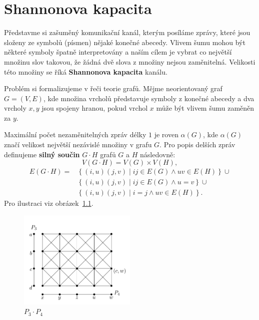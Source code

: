 \chapter{Shannonova kapacita}

Představme si zašuměný komunikační kanál, kterým posíláme zprávy, které jsou složeny ze symbolů (písmen) nějaké konečné abecedy. Vlivem šumu mohou být některé symboly špatně interpretovány a naším cílem je vybrat co největší množinu slov takovou, že žádná dvě slova z množiny nejsou zaměnitelná. Velikosti této množiny se říká \textbf{Shannonova kapacita} kanálu.

Problém si formalizujeme v řeči teorie grafů. Mějme neorientovaný graf $G = (V, E)$, kde množina vrcholů představuje symboly z konečné abecedy a dva vrcholy $x, y$ jsou spojeny hranou, pokud vrchol $x$ může být vlivem šumu zaměněn za $y$.

Maximální počet nezaměnitelných zpráv délky $1$ je roven $\alpha(G)$, kde $\alpha(G)$ značí velikost největší nezávislé množiny v grafu $G$. Pro popis delších zpráv definujeme \textbf{silný součin} $G \cdot H$ grafů $G$ a $H$ následovně:
$$
    V(G \cdot H) = V(G) \times V(H),
$$
\begin{equation*}
    \begin{split}
    E(G \cdot H) = &\left\{ (i,u)(j,v) \mid ij \in E(G) \wedge uv \in E(H) \right\} \cup \\
                   &\left\{ (i,u)(j,v) \mid ij \in E(G) \wedge u = v \right\} \cup \\
                   &\left\{ (i,u)(j,v) \mid i = j \wedge uv \in E(H) \right\}.
    \end{split}
\end{equation*}
Pro ilustraci viz obrázek~\ref{fig:strong_product_P3_P4}.

\begin{figure}[h!]
    \centering
    \includegraphics[width=0.5\textwidth]{img/strong_product_P3_P4.png}   
    \caption{$P_3 \cdot P_4$}
    \label{fig:strong_product_P3_P4}
\end{figure}